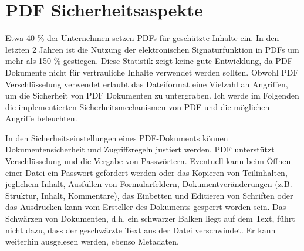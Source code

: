\section{PDF Sicherheitsaspekte}
Etwa 40 \% der Unternehmen setzen PDFs für geschützte Inhalte ein. In den letzten 2 Jahren ist die Nutzung der elektronischen Signaturfunktion in PDFs um mehr als 150 \% gestiegen. \cite{formilo} Diese Statistik zeigt keine gute Entwicklung, da PDF-Dokumente nicht für vertrauliche Inhalte verwendet werden sollten. Obwohl PDF Verschlüsselung verwendet erlaubt das Dateiformat eine Vielzahl an Angriffen, um die Sicherheit von PDF Dokumenten zu untergraben. Ich werde im Folgenden die implementierten Sicherheitsmechanismen von PDF und die möglichen Angriffe beleuchten.
\par
In den Sicherheitseinstellungen eines PDF-Dokuments können Dokumentensicherheit und Zugriffsregeln justiert werden. PDF unterstützt Verschlüsselung und die Vergabe von Passwörtern. Eventuell kann beim Öffnen einer Datei ein Passwort gefordert werden oder das Kopieren von Teilinhalten, jeglichem Inhalt, Ausfüllen von Formularfeldern, Dokumentveränderungen (z.B. Struktur, Inhalt, Kommentare), das Einbetten und Editieren von Schriften oder das Ausdrucken kann vom Ersteller des Dokuments gesperrt worden sein. Das Schwärzen von Dokumenten, d.h. ein schwarzer Balken liegt auf dem Text, führt nicht dazu, dass der geschwärzte Text aus der Datei verschwindet. Er kann weiterhin ausgelesen werden, ebenso Metadaten. 
\cite{adobe-pdf-pades}

